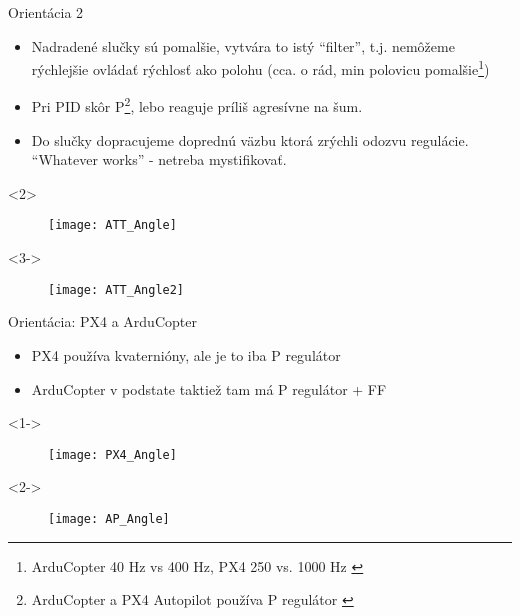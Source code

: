 \begin{frame}[t]{Orientácia 2}
\begin{itemize}
  \item<1-> Nadradené slučky sú pomalšie, vytvára to istý ``filter'', t.j. nemôžeme rýchlejšie ovládať rýchlosť ako polohu (cca. o rád, min polovicu pomalšie\footnote{ArduCopter 40 Hz vs 400 Hz, PX4 250 vs. 1000 Hz \citep{AP:PID,PX4:PID}}) \citep{AP:PID,PX4:PID}
  \item<2-> Pri PID skôr P\footnote{ArduCopter a PX4 Autopilot používa P regulátor \citep{PX4:PID,AP:PIDDOC}}, lebo reaguje príliš agresívne na šum.
  \item<3-> Do slučky dopracujeme doprednú väzbu  ktorá zrýchli odozvu regulácie. ``Whatever works'' - netreba mystifikovať.
  \end{itemize}



  \begin{onlyenv}<2>
  \begin{figure}
\centering
  \texttt{[image: ATT\_Angle]}\\
\end{figure}
\end{onlyenv}

  \begin{onlyenv}<3->
\begin{figure}
\centering
  \texttt{[image: ATT\_Angle2]}\\
 \end{figure}
\end{onlyenv}

  \end{frame}



  \begin{frame}[t]{Orientácia: PX4 a ArduCopter}
\begin{itemize}
  \item<1-> PX4 používa kvaternióny, ale je to iba P regulátor
  \item<2-> ArduCopter v podstate taktiež tam má P regulátor + FF
\end{itemize}

  \begin{onlyenv}<1->
  \begin{figure}
\centering
  \texttt{[image: PX4\_Angle]}\\
\end{figure}
\end{onlyenv}


  \begin{onlyenv}<2->
  \begin{figure}
\centering
  \texttt{[image: AP\_Angle]}\\
\end{figure}
\end{onlyenv}

  \end{frame}

